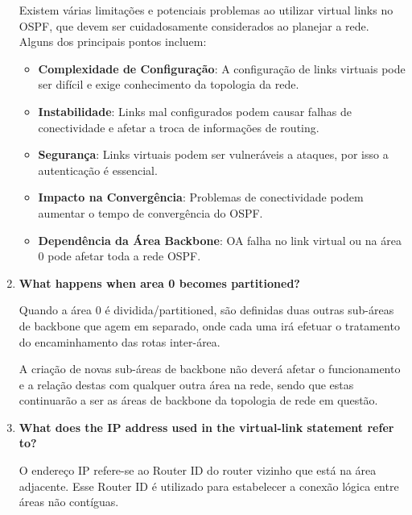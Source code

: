 \documentclass[11pt,english, openright, oneside]{book}
\begin{document}
\begin{enumerate}
  \par Existem várias limitações e potenciais problemas ao utilizar virtual links no OSPF, que devem ser cuidadosamente considerados ao planejar a rede. Alguns dos principais pontos incluem:

  \begin{itemize}
    \item \textbf{Complexidade de Configuração}: A configuração de links virtuais pode ser difícil e exige conhecimento da topologia da rede.
    \item \textbf{Instabilidade}: Links mal configurados podem causar falhas de conectividade e afetar a troca de informações de routing.
    \item \textbf{Segurança}: Links virtuais podem ser vulneráveis a ataques, por isso a autenticação é essencial.
    \item \textbf{Impacto na Convergência}: Problemas de conectividade podem aumentar o tempo de convergência do OSPF.
    \item \textbf{Dependência da Área Backbone}: OA falha no link virtual ou na área 0 pode afetar toda a rede OSPF.
  \end{itemize}
  \vspace{0.2cm}

  \newpage
  \item \textbf{What happens when area 0 becomes partitioned?}
  \vspace{0.2cm}

  \par Quando a área 0 é dividida/partitioned, são definidas duas outras sub-áreas de backbone que agem em separado, onde cada uma irá efetuar o tratamento do encaminhamento das rotas inter-área.
  \vspace{0.2cm}

  \par A criação de novas sub-áreas de backbone não deverá afetar o funcionamento e a relação destas com qualquer outra área na rede, sendo que estas continuarão a ser as áreas de backbone da topologia de rede em questão.
  \vspace{0.2cm}

  \item \textbf{What does the IP address used in the virtual-link statement refer to?}
  \vspace{0.2cm}

  \par O endereço IP refere-se ao Router ID do router vizinho que está na área adjacente. Esse Router ID é utilizado para estabelecer a conexão lógica entre áreas não contíguas.
  \vspace{0.2cm}


\end{enumerate}
\end{document}
